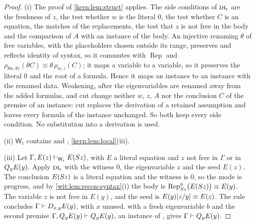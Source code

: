\begin{proof}
(i) The proof of \cref{kern:lem:struct} applies.  The side conditions of
$\rulename{DI}_{\mathrm{r}}$ are the freshness of $z$, the test whether $w$ is
the literal $0$, the test whether $C$ is an equation, the matches of the
replacements, the test that $z$ is not free in the body and the comparison of
$A$ with an instance of the body.  An injective renaming $\theta$ of free
variables, with the placeholders chosen outside its range, preserves and
reflects identity of syntax, so it commutes with $\operatorname{Rep}$ and
$\rho_{\theta w,\theta z}(\theta C)\equiv\theta\,\rho_{w,z}(C)$; it maps a
variable to a variable, so it preserves the literal $0$ and the root of a
formula.  Hence it maps an instance to an instance with the renamed data.
Weakening, after the eigenvariables are renamed away from the added formulas,
and cut change neither $w$, $z$, $A$ nor the conclusion $C$ of the premise of
an instance: cut replaces the derivation of a retained assumption and leaves
every formula of the instance unchanged.  So both keep every side condition.
No substitution into a derivation is used.

(ii) $\mathsf{W}_{\mathrm r}$ contains  and ;
\cref{kern:lem:local}(iii).

(iii) Let $\Gamma,E(z)\vdash_{\mathsf{W}_{\mathrm r}}E(S z)$, with $E$ a
literal equation and $z$ not free in $\Gamma$ or in $Q_{y}E(y)$.  Apply
$\rulename{DI}_{\mathrm{r}}$ with the witness $0$, the eigenvariable $z$ and
the seed $E(z)$.  The conclusion $E(S z)$ is a literal equation and the
witness is $0$, so the mode is progress, and by
\cref{wit:lem:recon-syntax}(i) the body is
$\operatorname{Rep}_{S z}^{y}\bigl(E(S z)\bigr)\equiv E(y)$.  The variable
$z$ is not free in $E(y)$, and the seed is $E(y)[z/y]\equiv E(z)$.  The
rule concludes $\Gamma\vdash D_{x,y}E(y)$, with $x$ unused.  
with a fresh eigenvariable $b$ and the second premise
$\Gamma,Q_{y}E(y)\vdash Q_{y}E(y)$, an instance of , gives
$\Gamma\vdash Q_{y}E(y)$.


\end{proof}
